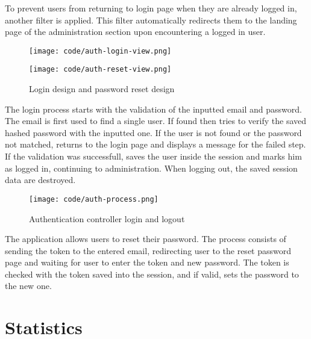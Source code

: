 \documentclass[
  digital,     %
  oneside,     %
  nosansbold,  %
  colorbold, %
  lof,         %
  lot,         %
]{fithesis4}
\begin{document}
To prevent users from returning to login page when they are already logged in, another filter is applied. This filter automatically redirects them to the landing page of the administration section upon encountering a logged in user.

\begin{figure}[!htbp]
	\begin{center}
		\begin{minipage}{.4\textwidth}
			\texttt{[image: code/auth-login-view.png]}
		\end{minipage}
		\begin{minipage}{.4\textwidth}
			\texttt{[image: code/auth-reset-view.png]}
		\end{minipage}
	\end{center}
	\caption{Login design and password reset design}
	\label{fig:auth-views}
\end{figure}

The login process starts with the validation of the inputted email and password. The email is first used to find a single user. If found then tries to verify the saved hashed password with the inputted one. If the user is not found or the password not matched, returns to the login page and displays a message for the failed step. If the validation was successfull, saves the user inside the session and marks him as logged in, continuing to administration. When logging out, the saved session data are destroyed.

\begin{figure}[!htbp]
	\begin{center}
		\begin{minipage}{.9\textwidth}
			\texttt{[image: code/auth-process.png]}
		\end{minipage}
	\end{center}
	\caption{Authentication controller login and logout}
	\label{fig:auth-process}
\end{figure}

The application allows users to reset their password. The process consists of sending the token to the entered email, redirecting user to the reset password page and waiting for user to enter the token and new password. The token is checked with the token saved into the session, and if valid, sets the password to the new one.

\section{Statistics}
\end{document}
